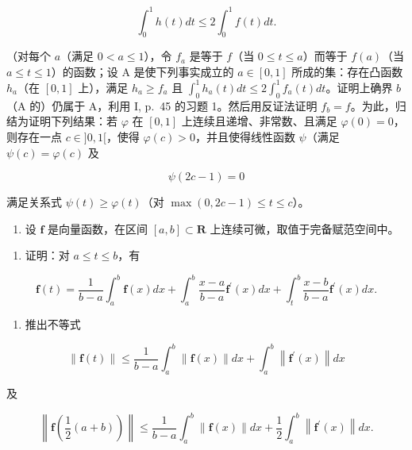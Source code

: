 \[
\int_ {0} ^ {1} h (t) d t \leqslant 2 \int_ {0} ^ {1} f (t) d t.
\]

（对每个 \(a\)（满足 \(0 < a \leqslant 1\)），令 \(f_a\) 是等于 \(f\)（当 \(0 \leqslant t \leqslant a\)）而等于 \(f(a)\)（当 \(a \leqslant t \leqslant 1\)）的函数；设 A 是使下列事实成立的 \(a \in [0,1]\) 所成的集：存在凸函数 \(h_a\)（在 \([0,1]\) 上），满足 \(h_a \geqslant f_a\) 且 \(\int_0^1 h_a(t)dt \leqslant 2\int_0^1 f_a(t)dt\)。证明上确界 \(b\)（A 的）仍属于 A，利用 I, p.~45 的习题 1。然后用反证法证明 \(f_{b} = f\)。为此，归结为证明下列结果：若 \(\varphi\) 在 \([0, 1]\) 上连续且递增、非常数、且满足 \(\varphi(0) = 0\)，则存在一点 \(c \in ]0, 1[\)，使得 \(\varphi(c) > 0\)，并且使得线性函数 \(\psi\)（满足 \(\psi(c) = \varphi(c)\) 及

\[
\psi (2 c - 1) = 0
\]

满足关系式 \(\psi(t) \geqslant \varphi(t)\)（对 \(\max(0, 2c - 1) \leqslant t \leqslant c\)）。

\begin{enumerate}
\def\labelenumi{\arabic{enumi})}
\setcounter{enumi}{22}
\tightlist
\item
  设 \(\mathbf{f}\) 是向量函数，在区间 \([a, b] \subset \mathbf{R}\) 上连续可微，取值于完备赋范空间中。
\end{enumerate}

\begin{enumerate}
\def\labelenumi{\alph{enumi})}
\tightlist
\item
  证明：对 \(a \leqslant t \leqslant b\)，有
\end{enumerate}

\[
\mathbf {f} (t) = \frac {1}{b - a} \int_ {a} ^ {b} \mathbf {f} (x) d x + \int_ {a} ^ {b} \frac {x - a}{b - a} \mathbf {f} ^ {\prime} (x) d x + \int_ {t} ^ {b} \frac {x - b}{b - a} \mathbf {f} ^ {\prime} (x) d x.
\]

\begin{enumerate}
\def\labelenumi{\alph{enumi})}
\setcounter{enumi}{1}
\tightlist
\item
  推出不等式
\end{enumerate}

\[
\| \mathbf {f} (t) \| \leqslant \frac {1}{b - a} \int_ {a} ^ {b} \| \mathbf {f} (x) \| d x + \int_ {a} ^ {b} \left\| \mathbf {f} ^ {\prime} (x) \right\| d x
\]

及

\[
\left\| \mathbf {f} \left(\frac {1}{2} (a + b)\right) \right\| \leqslant \frac {1}{b - a} \int_ {a} ^ {b} \| \mathbf {f} (x) \| d x + \frac {1}{2} \int_ {a} ^ {b} \left\| \mathbf {f} ^ {\prime} (x) \right\| d x.
\]

